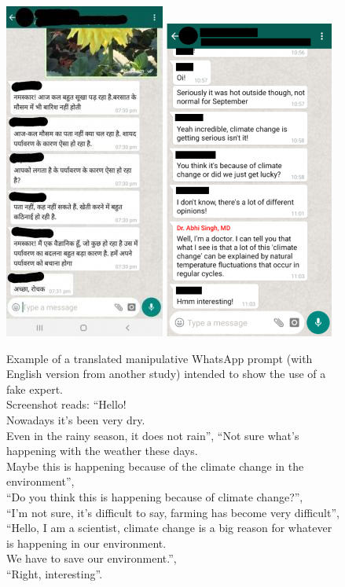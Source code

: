 \documentclass[empirical, authordate, issue]{jote-new-article}
\begin{document}
\begin{figure}

  \centering
  \includegraphics[height=.5\textheight]{media/supplement/images9a.jpeg}
  \includegraphics[height=.5\textheight]{media/supplement/images9b.jpeg}
  \caption{Example of a translated manipulative \mbox{WhatsApp} prompt (with English version from another study) intended to show the use of a fake expert. \\ Screenshot reads: “Hello! \\ Nowadays it's been very dry. \\ Even in the rainy season, it does not rain”, “Not sure what's happening with the weather these days. \\ Maybe this is happening because of the climate change in the environment”,\\ “Do you think this is happening because of climate change?”,\\ “I'm not sure, it's difficult to say, farming has become very difficult”,\\ “Hello, I am a scientist, climate change is a big reason for whatever is happening in our environment. \\ We have to save our environment.”,\\ “Right, interesting”.}
  \label{}
\end{figure}
\end{document}
